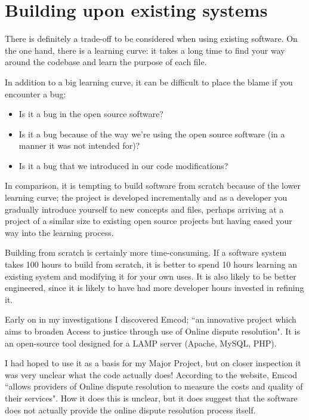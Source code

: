 \chapter{Building upon existing systems}\label{appendix:buildingUponExistingSystems}

There is definitely a trade-off to be considered when using existing software. On the one hand, there is a learning curve: it takes a long time to find your way around the codebase and learn the purpose of each file.

In addition to a big learning curve, it can be difficult to place the blame if you encounter a bug:

\begin{itemize}
\item Is it a bug in the open source software?
\item Is it a bug because of the way we're using the open source software (in a manner it was not intended for)?
\item Is it a bug that we introduced in our code modifications?
\end{itemize}

In comparison, it is tempting to build software from scratch because of the lower learning curve; the project is developed incrementally and as a developer you gradually introduce yourself to new concepts and files, perhaps arriving at a project of a similar size to existing open source projects but having eased your way into the learning process.

Building from scratch is certainly more time-consuming. If a software system takes 100 hours to build from scratch, it is better to spend 10 hours learning an existing system and modifying it for your own uses. It is also likely to be better engineered, since it is likely to have had more developer hours invested in refining it.

Early on in my investigations I discovered Emcod; ``an innovative project which aims to broaden Access to justice through use of Online dispute resolution". It is an open-source tool designed for a LAMP server (Apache, MySQL, PHP).

I had hoped to use it as a basis for my Major Project, but on closer inspection it was very unclear what the code actually does! According to the website, Emcod ``allows providers of Online dispute resolution to measure the costs and quality of their services". How it does this is unclear, but it does suggest that the software does not actually provide the online dispute resolution process itself.

